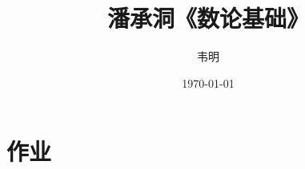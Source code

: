 \documentclass[12pt,lang=cn,thmcnt=subsection,pad]{elegantbook}
\title{潘承洞《数论基础》}
\author{韦明}
\date{\today}
\numberwithin{equation}{section}
\begin{document}
\maketitle
\frontmatter
%

\tableofcontents

\mainmatter
\chapter{作业}
%


\end{document}

